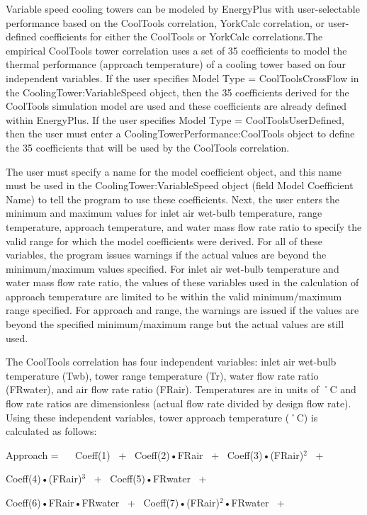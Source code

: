 Variable speed cooling towers can be modeled by EnergyPlus with user-selectable performance based on the CoolTools correlation, YorkCalc correlation, or user-defined coefficients for either the CoolTools or YorkCalc correlations.The empirical CoolTools tower correlation uses a set of 35 coefficients to model the thermal performance (approach temperature) of a cooling tower based on four independent variables. If the user specifies Model Type = CoolToolsCrossFlow in the CoolingTower:VariableSpeed object, then the 35 coefficients derived for the CoolTools simulation model are used and these coefficients are already defined within EnergyPlus. If the user specifies Model Type = CoolToolsUserDefined, then the user must enter a CoolingTowerPerformance:CoolTools object to define the 35 coefficients that will be used by the CoolTools correlation.

The user must specify a name for the model coefficient object, and this name must be used in the CoolingTower:VariableSpeed object (field Model Coefficient Name) to tell the program to use these coefficients. Next, the user enters the minimum and maximum values for inlet air wet-bulb temperature, range temperature, approach temperature, and water mass flow rate ratio to specify the valid range for which the model coefficients were derived. For all of these variables, the program issues warnings if the actual values are beyond the minimum/maximum values specified. For inlet air wet-bulb temperature and water mass flow rate ratio, the values of these variables used in the calculation of approach temperature are limited to be within the valid minimum/maximum range specified. For approach and range, the warnings are issued if the values are beyond the specified minimum/maximum range but the actual values are still used.

The CoolTools correlation has four independent variables: inlet air wet-bulb temperature (Twb), tower range temperature (Tr), water flow rate ratio (FRwater), and air flow rate ratio (FRair). Temperatures are in units of ˚C and flow rate ratios are dimensionless (actual flow rate divided by design flow rate). Using these independent variables, tower approach temperature (˚C) is calculated as follows:

Approach = ~~ Coeff(1)~ +~ Coeff(2)•FRair~ +~ Coeff(3)•(FRair)\(^{2}\)~ +

Coeff(4)•(FRair)\(^{3}\)~ +~ Coeff(5)•FRwater~ +

Coeff(6)•FRair•FRwater~ +~ Coeff(7)•(FRair)\(^{2}\)•FRwater~ +

